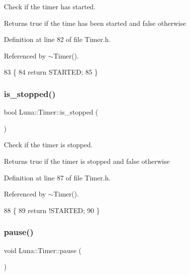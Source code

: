 Check if the timer has started. 

\begin{DoxyReturn}{Returns}
true if the time has been started and false otherwise 
\end{DoxyReturn}


Definition at line 82 of file Timer.\+h.



Referenced by $\sim$\+Timer().


\begin{DoxyCode}
83     \{
84         \textcolor{keywordflow}{return} STARTED;
85     \}
\end{DoxyCode}
\mbox{\label{classLuna_1_1Timer_aa028fb717dce42cbf9806ce604ba09b6}} 
\subsubsection{\texorpdfstring{is\+\_\+stopped()}{is\_stopped()}}
{\footnotesize\ttfamily bool Luna\+::\+Timer\+::is\+\_\+stopped (\begin{DoxyParamCaption}{ }\end{DoxyParamCaption})\hspace{0.3cm}{\ttfamily [inline]}}



Check if the timer is stopped. 

\begin{DoxyReturn}{Returns}
true if the timer is stopped and false otherwise 
\end{DoxyReturn}


Definition at line 87 of file Timer.\+h.



Referenced by $\sim$\+Timer().


\begin{DoxyCode}
88     \{
89         \textcolor{keywordflow}{return} !STARTED;
90     \}
\end{DoxyCode}
\mbox{\label{classLuna_1_1Timer_af2663caeb132da9375669733ac826cc8}} 
\subsubsection{\texorpdfstring{pause()}{pause()}}
{\footnotesize\ttfamily void Luna\+::\+Timer\+::pause (\begin{DoxyParamCaption}{ }\end{DoxyParamCaption})\hspace{0.3cm}{\ttfamily [inline]}}



